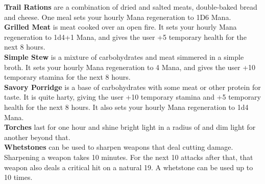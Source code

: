 \textbf{Trail Rations} are a combination of dried and salted meats, double-baked bread and cheese.
One meal sets your hourly Mana regeneration to 1D6 Mana.\\

\textbf{Grilled Meat} is meat cooked over an open fire.
It sets your hourly Mana regeneration to 1d4+1 Mana, and gives the user +5 temporary health for the next 8 hours.\\

\textbf{Simple Stew} is a mixture of carbohydrates and meat simmered in a simple broth.
It sets your hourly Mana regeneration to 4 Mana, and gives the user +10 temporary stamina for the next 8 hours.\\

\textbf{Savory Porridge} is a base of carbohydrates with some meat or other protein for taste.
It is quite harty, giving the user +10 temporary stamina and +5 temporary health for the next 8 hours.
It also sets your hourly Mana regeneration to 1d4 Mana.\\

\textbf{Torches} last for one hour and shine bright light in a radius of  and dim light for another  beyond that.\\

\textbf{Whetstones} can be used to sharpen weapons that deal cutting damage.
Sharpening a weapon takes 10 minutes.
For the next 10 attacks after that, that weapon also deals a critical hit on a natural 19.
A whetstone can be used up to 10 times.\\